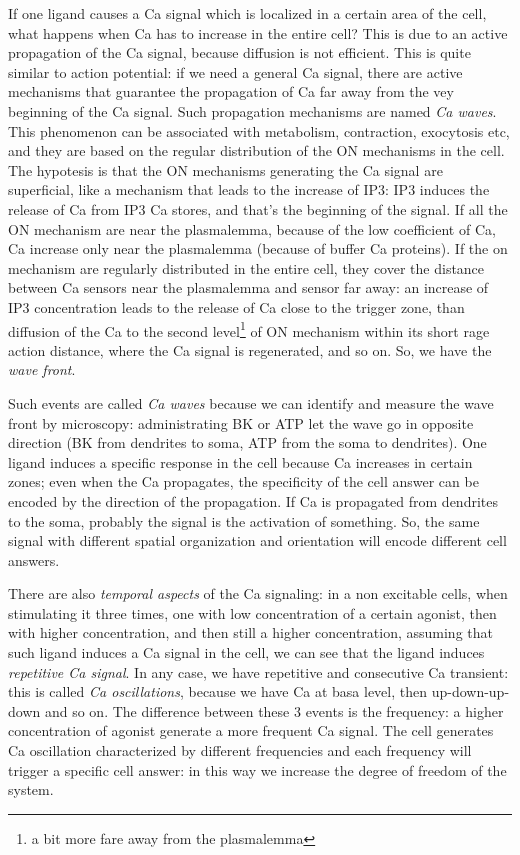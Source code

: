 \documentclass[a4paper, 12pt]{book}
\begin{document}
If one ligand causes a Ca signal which is localized in a certain area of the cell, what happens when Ca has to increase in the entire cell? This is due to an active propagation of the Ca signal, because diffusion is not efficient. This is quite similar to action potential: if we need a general Ca signal, there are active mechanisms that guarantee the propagation of Ca far away from the vey beginning of the Ca signal. Such propagation mechanisms are named \emph{Ca waves}. This phenomenon can be associated with metabolism, contraction, exocytosis etc, and they are based on the regular distribution of the ON mechanisms in the cell. The hypotesis is that the ON mechanisms generating the Ca signal are superficial, like a mechanism that leads to the increase of IP3: IP3 induces the release of Ca from IP3 Ca stores, and that's the beginning of the signal. If all the ON mechanism are near the plasmalemma, because of the low coefficient of Ca, Ca increase only near the plasmalemma (because of buffer Ca proteins). If the on mechanism are regularly distributed in the entire cell, they cover the distance between Ca sensors near the plasmalemma and sensor far away: an increase of IP3 concentration leads to the release of Ca close to the trigger zone, than diffusion of the Ca to the second level\footnote{a bit more fare away from the plasmalemma} of ON mechanism within its short rage action distance, where the Ca signal is regenerated, and so on. So, we have the \emph{wave front}.

Such events are called \emph{Ca waves} because we can identify and measure the wave front by microscopy: administrating BK or ATP let the wave go in opposite direction (BK from dendrites to soma, ATP from the soma to dendrites). One ligand induces a specific response in the cell because Ca increases in certain zones; even when the Ca propagates, the specificity of the cell answer can be encoded by the direction of the propagation. If Ca is propagated from dendrites to the soma, probably the signal is the activation of something. So, the same signal with different spatial organization and orientation will encode different cell answers.


There are also \emph{temporal aspects} of the Ca signaling: in a non excitable cells, when stimulating it three times, one with low concentration of a certain agonist, then with higher concentration, and then still a higher concentration, assuming that such ligand induces a Ca signal in the cell, we can see that the ligand induces \emph{repetitive Ca signal}. In any case, we have repetitive and consecutive Ca transient: this is called \emph{Ca oscillations}, because we have Ca at basa level, then up-down-up-down and so on. The difference between these 3 events is the frequency: a higher concentration of agonist generate a more frequent Ca signal. The cell generates Ca oscillation characterized by different frequencies and each frequency will trigger a specific cell answer: in this way we increase the degree of freedom of the system.
\end{document}
